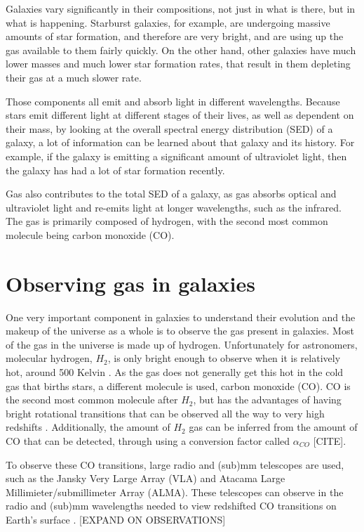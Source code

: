 \documentclass[twoside,single]{lion-msc}
\begin{document}
Galaxies vary significantly in their compositions, not just in what is there, but in what is happening. Starburst galaxies, for example, are undergoing massive amounts of star formation, and therefore are very bright, and are using up the gas available to them fairly quickly. On the other hand, other galaxies have much lower masses and much lower star formation rates, that result in them depleting their gas at a much slower rate.

Those components all emit and absorb light in different wavelengths. Because stars emit different light at different stages of their lives, as well as dependent on their mass, by looking at the overall spectral energy distribution (SED) of a galaxy, a lot of information can be learned about that galaxy and its history. For example, if the galaxy is emitting a significant amount of ultraviolet light, then the galaxy has had a lot of star formation recently. 

Gas also contributes to the total SED of a galaxy, as gas absorbs optical and ultraviolet light and re-emits light at longer wavelengths, such as the infrared. The gas is primarily composed of hydrogen, with the second most common molecule being carbon monoxide (CO). 

\section{Observing gas in galaxies}

One very important component in galaxies to understand their evolution and the makeup of the universe as a whole is to observe the gas present in galaxies. Most of the gas in the universe is made up of hydrogen. Unfortunately for astronomers, molecular hydrogen, $H_2$, is only bright enough to observe when it is relatively hot, around 500 Kelvin \cite{decarli2019alma}. As the gas does not generally get this hot in the cold gas that births stars, a different molecule is used, carbon monoxide (CO). CO is the second most common molecule after $H_2$, but has the advantages of having bright rotational transitions that can be observed all the way to very high redshifts \cite{walter2016alma, decarli2019alma}. Additionally, the amount of $H_2$ gas can be inferred from the amount of CO that can be detected, through using a conversion factor called $\alpha_{CO}$ [CITE]. 

To observe these CO transitions, large radio and (sub)mm telescopes are used, such as the Jansky Very Large Array (VLA) and Atacama Large Millimieter/submillimeter Array (ALMA). These telescopes can observe in the radio and (sub)mm wavelengths needed to view redshifted CO transitions on Earth's surface \cite{decarli2019alma}. [EXPAND ON OBSERVATIONS]
\end{document}
